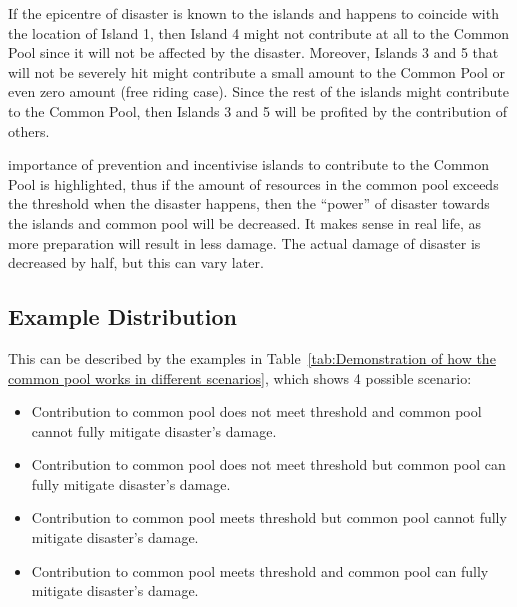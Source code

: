 If the epicentre of disaster is known to the islands and happens to coincide with the location of Island 1, then Island 4 might not contribute at all to the Common Pool since it will not be affected by the disaster. Moreover, Islands 3 and 5 that will not be severely hit might contribute a small amount to the Common Pool or even zero amount (free riding case). Since the rest of the islands might contribute to the Common Pool, then Islands 3 and 5 will be profited by the contribution of others.

importance of prevention and incentivise islands to contribute to the Common Pool is highlighted, thus if the amount of resources in the common pool exceeds the threshold when the disaster happens, then the “power” of disaster towards the islands and common pool will be decreased. It makes sense in real life, as more preparation will result in less damage. The actual damage of disaster is decreased by half, but this can vary later.

\subsection{Example Distribution}
This can be described by the examples in Table~\ref{tab:Demonstration of how the common pool works in different scenarios}, which shows 4 possible scenario:

\begin{itemize}
    \item Contribution to common pool does not meet threshold and common pool cannot fully mitigate disaster’s damage.
    \item Contribution to common pool does not meet threshold but common pool can fully mitigate disaster’s damage.
    \item Contribution to common pool meets threshold but common pool cannot fully mitigate disaster’s damage.
    \item Contribution to common pool meets threshold and common pool can fully mitigate disaster’s damage.
\end{itemize}

